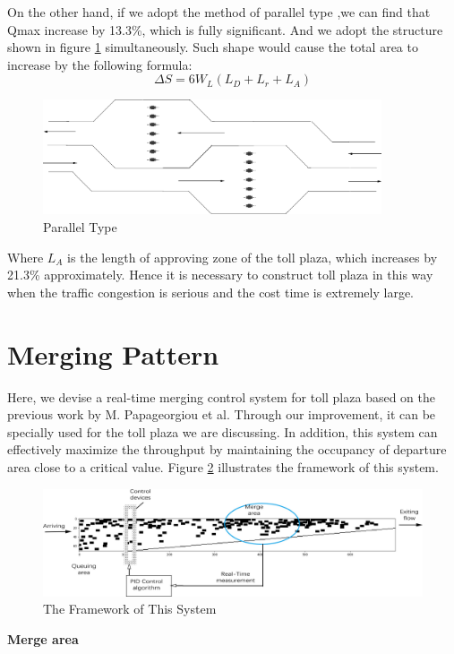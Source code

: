 \documentclass{mcmthesis}
\begin{document}
On the other hand, if we adopt the method
of parallel type ,we can find that Qmax
increase by 13.3\%, which is fully significant.
And we adopt the structure shown in figure \ref{fig10}
simultaneously. Such shape would cause the total
area to increase by the following formula:
$$\Delta S=6W_{L}(L_D+L_r+L_A)$$
\begin{figure}[h]
\small
\centering
\includegraphics[width=10cm]{figure10}
\caption{Parallel Type}\label{fig10}
\end{figure}
Where $L_{A}$ is the length of approving zone of
the toll plaza, which increases by 21.3\% approximately. Hence it is necessary to construct
toll plaza in this way when the traffic congestion
is serious and the cost time is extremely large.


\section{Merging Pattern}

Here, we devise a real-time merging control system for
toll plaza based on the previous work by M. Papageorgiou
et al. Through our improvement, it can be specially used
for the toll plaza we are discussing. In addition, this
system can effectively maximize the throughput by
maintaining the occupancy of departure area close to a
critical value. Figure \ref{fig2} illustrates the framework of
this system.

\begin{figure}[h]
\small
\centering
\includegraphics[width=15cm]{figure2}
\caption{The Framework of This System}\label{fig2}
\end{figure}



\textbf{Merge area}
\end{document}
